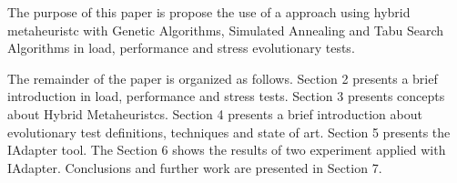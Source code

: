 %
%
%
The purpose of this paper is propose the use of a approach using  hybrid metaheuristc  with  Genetic Algorithms, Simulated Annealing and Tabu Search Algorithms  in load, performance and stress evolutionary tests.

The remainder of the paper is organized as follows. Section 2 presents a brief introduction in load, performance and stress tests. Section 3 presents concepts about Hybrid Metaheuristcs. Section 4 presents a brief introduction about evolutionary test definitions, techniques and state of art. Section 5 presents the IAdapter tool. The Section 6 shows the results of two experiment applied with IAdapter. Conclusions and further work are presented in Section 7.